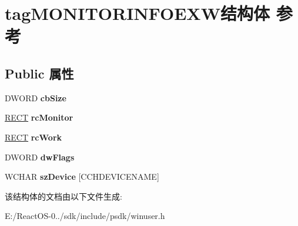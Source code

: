 \hypertarget{structtag_m_o_n_i_t_o_r_i_n_f_o_e_x_w}{}\section{tag\+M\+O\+N\+I\+T\+O\+R\+I\+N\+F\+O\+E\+X\+W结构体 参考}
\label{structtag_m_o_n_i_t_o_r_i_n_f_o_e_x_w}
\subsection*{Public 属性}
\begin{DoxyCompactItemize}
\item 
\mbox{\label{structtag_m_o_n_i_t_o_r_i_n_f_o_e_x_w_a2e25afd54258ea639ccd47a9df3c8292}} 
D\+W\+O\+RD {\bfseries cb\+Size}
\item 
\mbox{\label{structtag_m_o_n_i_t_o_r_i_n_f_o_e_x_w_a6a3feec28a631c584610d0fcbc8bbe03}} 
\hyperlink{structtag_r_e_c_t}{R\+E\+CT} {\bfseries rc\+Monitor}
\item 
\mbox{\label{structtag_m_o_n_i_t_o_r_i_n_f_o_e_x_w_a7be392bcbe7f12e0e73dcde4e26b3368}} 
\hyperlink{structtag_r_e_c_t}{R\+E\+CT} {\bfseries rc\+Work}
\item 
\mbox{\label{structtag_m_o_n_i_t_o_r_i_n_f_o_e_x_w_affec148bdc23f86008af5784dc8df940}} 
D\+W\+O\+RD {\bfseries dw\+Flags}
\item 
\mbox{\label{structtag_m_o_n_i_t_o_r_i_n_f_o_e_x_w_a9d7d6cb2b406ae4f747f9a21cb34e6ab}} 
W\+C\+H\+AR {\bfseries sz\+Device} \mbox{[}C\+C\+H\+D\+E\+V\+I\+C\+E\+N\+A\+ME\mbox{]}
\end{DoxyCompactItemize}


该结构体的文档由以下文件生成\+:\begin{DoxyCompactItemize}
\item 
E\+:/\+React\+O\+S-\/0../sdk/include/psdk/winuser.\+h\end{DoxyCompactItemize}
